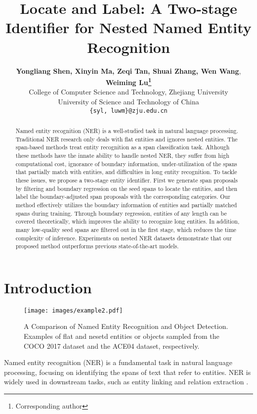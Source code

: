 \documentclass[11pt,a4paper]{article}
\title{Locate and Label: A Two-stage Identifier for Nested Named Entity Recognition}
\author{
\textbf{Yongliang Shen, Xinyin Ma, Zeqi Tan, Shuai Zhang, Wen Wang}, \textbf{Weiming Lu\thanks{\textsuperscript{} Corresponding author}}\\
 College of Computer Science and Technology, Zhejiang University \\
 University of Science and Technology of China\\
\texttt{\{syl, luwm\}@zju.edu.cn}
}
\date{}
\begin{document}
\maketitle


\begin{abstract}

Named entity recognition (NER) is a well-studied task in natural language processing. Traditional NER research only deals with flat entities and ignores nested entities. The span-based methods treat entity recognition as a span classification task. Although these methods have the innate ability to handle nested NER, they suffer from high computational cost, ignorance of boundary information, under-utilization of the spans that partially match with entities, and difficulties in long entity recognition. To tackle these issues, we propose a two-stage entity identifier. First we generate span proposals by filtering and boundary regression on the seed spans to locate the entities, and then label the boundary-adjusted span proposals with the corresponding categories. Our method effectively utilizes the boundary information of entities and partially matched spans during training. Through boundary regression, entities of any length can be covered theoretically, which improves the ability to recognize long entities. In addition,  many low-quality seed spans are filtered out in the first stage, which reduces the time complexity of inference. Experiments on nested NER datasets demonstrate that our proposed method outperforms previous state-of-the-art models.


\end{abstract}

\section{Introduction}

\begin{figure}[h]
  \centering
  \texttt{[image: images/example2.pdf]}
  \caption{A Comparison of Named Entity Recognition and Object Detection. Examples of flat and nesetd entities or objects sampled from the COCO 2017 dataset and the ACE04 dataset, respectively.}
   \label{fig:example}
\end{figure}

Named entity recognition (NER) is a fundamental task in natural language processing, focusing on identifying the spans of text that refer to entities. NER is widely used in downstream tasks, such as entity linking \citep{ganea-hofmann-2017-deep, le-titov-2018-improving} and relation extraction \citep{li-ji-2014-incremental, miwa-bansal-2016-end}.
\end{document}
